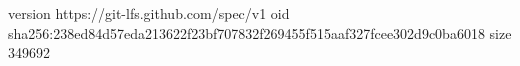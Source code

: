 version https://git-lfs.github.com/spec/v1
oid sha256:238ed84d57eda213622f23bf707832f269455f515aaf327fcee302d9c0ba6018
size 349692
